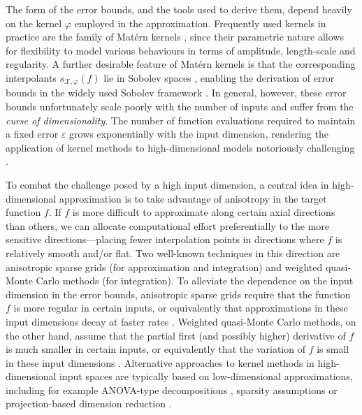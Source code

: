 \documentclass[pdflatex,sn-mathphys-num]{sn-jnl}%
\theoremstyle{thmstyleone}%
\theoremstyle{thmstyletwo}%
\theoremstyle{thmstylethree}%
\begin{document}
The form of the error bounds, and the tools used to derive them, depend heavily on the kernel $\varphi$ employed in the approximation. Frequently used kernels in practice are the family of Mat\'ern kernels \cite{matern2013spatial,porcu2024matern}, since their parametric nature allows for flexibility to model various behaviours in terms of amplitude, length-scale and regularity. A further desirable feature of Mat\'ern kernels is that the corresponding interpolants $s_{\mathcal{X},\varphi}(f)$ lie in Sobolev spaces \cite{adams2003sobolev},  enabling the derivation of error bounds in the widely used Sobolev framework \cite{wendland_2004,nww05,van2011information}. In general, however, these error bounds unfortunately scale poorly with the number of inputs and suffer from the \emph{curse of dimensionality}. The number of function evaluations required to maintain a fixed error $\varepsilon$ grows exponentially with the input dimension, rendering the application of kernel methods to high-dimensional models notoriously challenging \cite{Santner2003,gramacy2020surrogates,GoldsteinVernon2010}.

To combat the challenge posed by a high input dimension, a central idea in high-dimensional approximation is to take advantage of anisotropy in the target function \(f\). If \(f\) is more difficult to approximate along certain axial directions than others, we can allocate computational effort preferentially to the more sensitive directions---placing fewer interpolation points in directions where \(f\) is relatively smooth and/or flat. Two well-known techniques in this direction are anisotropic sparse grids (for approximation and integration) and weighted quasi-Monte Carlo methods (for integration). To alleviate the dependence on the input dimension in the error bounds, anisotropic sparse grids require that the function $f$ is more regular in certain inputs, or equivalently that approximations in these input dimensions decay at faster rates \cite{Nobile2008, Nobile2018, Rieger2019}. Weighted quasi-Monte Carlo methods, on the other hand, assume that the partial first (and possibly higher) derivative of $f$ is much smaller in certain inputs, or equivalently that the variation of $f$ is small in these input dimensions \cite{sloan1998quasi,dick2013high}. Alternative approaches to kernel methods in high-dimensional input spaces are typically based on low-dimensional approximations, including for example ANOVA-type decompositions \cite{rieger2024approximability,rieger2024constructive}, sparsity assumptions \cite{yang2015minimax} or projection-based dimension reduction \cite{liu2017dimension}. 
\end{document}
